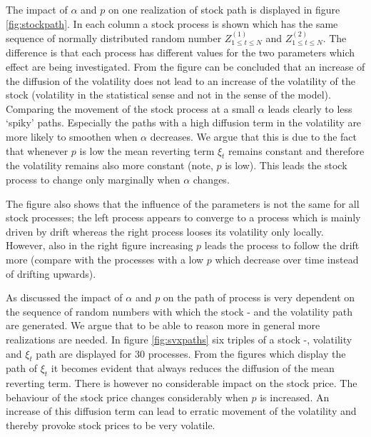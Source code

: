 \documentclass[a4paper,onecolumn]{IEEEtran}
\begin{document}
The impact of $\alpha$ and $p$ on one realization of stock path is displayed
in figure \ref{fig:stockpath}. In each column a stock process is shown which has
the same sequence of normally distributed random number $Z^{(1)}_{1\leq t\leq
N}$ and $Z^{(2)}_{1\leq t\leq N}$. The difference is that each process has
different values for the two parameters which effect are being investigated.
From the figure can be concluded that an increase of the diffusion of the
volatility does not lead to an increase of the volatility of the stock
(volatility in the statistical sense and not in the sense of the model).
Comparing the movement of the stock process at a small $\alpha$ leads clearly
to less `spiky' paths. Especially the paths with a high diffusion term in the
volatility are more likely to smoothen when $\alpha$ decreases. We argue that
this is due to the fact that whenever $p$ is low the mean reverting term
$\xi_t$ remains constant and therefore the volatility remains also more
constant (note, $p$ is low). This leads the stock process to change only
marginally when $\alpha$ changes.

The figure also shows that the influence of the parameters is not the same for
all stock processes; the left process appears to converge to a process which
is mainly driven by drift whereas the right process looses its volatility only
locally.  However, also in the right figure increasing $p$ leads the process
to follow the drift more (compare with the processes with a low $p$ which
decrease over time instead of drifting upwards).

As discussed the impact of $\alpha$ and $p$ on the path of process is very
dependent on the sequence of random numbers with which the stock - and the
volatility path are generated. We argue that to be able to reason more in
general more realizations are needed. In figure \ref{fig:svxpaths} six triples
of a stock -, volatility and $\xi_t$ path are displayed for 30 processes. From
the figures which display the path of $\xi_t$ it becomes evident that always
reduces the diffusion of the mean reverting term. There is however no
considerable impact on the stock price. The behaviour of the stock price
changes considerably when $p$ is increased. An increase of this diffusion term
can lead to erratic movement of the volatility and thereby provoke stock
prices to be very volatile.
\end{document}
